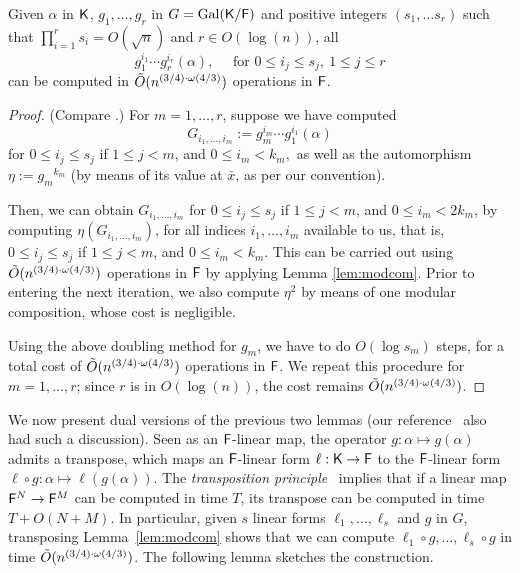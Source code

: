 \begin{lemma}\label{lem:selfcomp}
Given $\alpha$ in ${\mathsf{K}}$, $g_1, \ldots , g_{r}$ in $G =
\mathrm{Gal}({\mathsf{K}}/{\mathsf{F}})$ and positive integers $(s_1, \ldots s_r)$ such
that $\prod_{i = 1}^r s_i = O(\sqrt{n})$ and $r \in O(\log(n))$, all
  $$g_1^{i_1}\cdots g_r^{i_r}(\alpha) ,\quad \text{~for~} 0 \leq i_j
\leq s_j,\ 1 \leq j \leq r$$ can be computed in $\tilde{O}(n^{(3/4)\cdot \omega(4/3)})$
operations in ${\mathsf{F}}$.
\end{lemma}
\begin{proof}
(Compare \cite[Lemma~4]{KalSho98}.) For $m=1,\dots,r$, suppose we have computed 
  $$G_{i_1,\dots,i_m}:=g_m^{i_m}\cdots g_1^{i_1}(\alpha)$$ for $0 \leq
  i_j \leq s_j$ if $1 \leq j < m$, and $0 \leq i_m < k_m,$ as well as
  the automorphism $\eta:={g_m}^{k_m}$ (by means of its value at $\bar
  x$, as per our convention).
  
 Then, we can obtain $G_{i_1,\dots,i_m}$ for $0 \leq i_j \leq s_j$ if $1
 \leq j < m$, and $0 \leq i_m < 2k_m$, by computing
 $\eta(G_{i_1,\dots,i_m})$, for all indices $i_1,\dots,i_m$ available
 to us, that is, $0 \leq i_j \leq s_j$ if $1 \leq j < m$, and $0 \leq
 i_m < k_m$. This can be carried out using $\tilde{O}(n^{(3/4)\cdot \omega(4/3)})$ operations
 in ${\mathsf{F}}$ by applying Lemma \ref{lem:modcom}. Prior to entering the
 next iteration, we also compute $\eta^2$ by means of one modular
 composition, whose cost is negligible. 

 Using the above doubling method for $g_m$, we have to do $O(\log
 s_m)$ steps, for a total cost of $\tilde{O}(n^{(3/4)\cdot \omega(4/3)})$ operations in ${\mathsf{F}}$.  We
 repeat this procedure for $m=1,\dots,r$; since $r$ is in $O(\log(n))$,
 the cost remains $\tilde{O}(n^{(3/4)\cdot \omega(4/3)})$.
\end{proof}

We now present dual versions of the previous two lemmas (our
reference~\cite{KalSho98} also had such a discussion). Seen as an
${\mathsf{F}}$-linear map, the operator $g:\alpha \mapsto g(\alpha)$ admits a
transpose, which maps an ${\mathsf{F}}$-linear form $\ell:{\mathsf{K}}\to{\mathsf{F}}$ to the
${\mathsf{F}}$-linear form $\ell \circ g: \alpha \mapsto \ell(g(\alpha))$.  The
{\em transposition principle}~\cite{KaKiBs88,CaKaYa89} implies that if
a linear map ${\mathsf{F}}^N \to {\mathsf{F}}^M$ can be computed in time $T$, its
transpose can be computed in time $T+O(N+M)$. In particular, given $s$
linear forms $\ell_1,\dots,\ell_s$ and $g$ in $G$, transposing
Lemma~\ref{lem:modcom} shows that we can compute $\ell_1 \circ
g,\dots,\ell_s \circ g$ in time $\tilde{O}(n^{(3/4)\cdot \omega(4/3)})$. The following lemma
sketches the construction.

